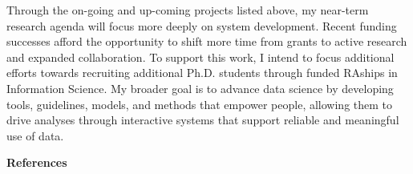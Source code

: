 \documentclass[11pt]{article}
\begin{document}
Through the on-going and up-coming projects listed above, my near-term research agenda will focus more deeply on system development. Recent funding successes afford the opportunity to shift more time from grants to active research and expanded collaboration.
To support this work, I intend to focus additional efforts towards recruiting additional Ph.D. students through funded RAships in Information Science.  
My broader goal 
is to advance 
data science by developing tools, guidelines, models, and methods that empower people, allowing them to drive analyses through interactive systems that support reliable and meaningful use of data.


{
\vspace{4pt}
\noindent
\textbf{References}
\vspace{-24pt}
\renewcommand\refname{\vskip -1cm}
\small


}


\pagebreak
\setcounter{page}{1}
\end{document}
